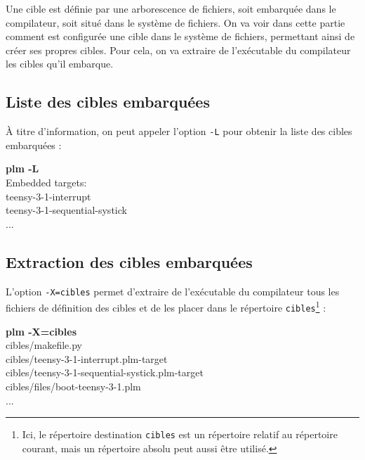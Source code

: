 











Une cible est définie par une arborescence de fichiers, soit embarquée dans le compilateur, soit situé dans le système de fichiers. On va voir dans cette partie comment est configurée une cible dans le système de fichiers, permettant ainsi de créer ses propres cibles. Pour cela, on va extraire de l'exécutable du compilateur les cibles qu'il embarque.

\subsection{Liste des cibles embarquées}
À titre d'information, on peut appeler l'option \texttt{-L} pour obtenir la liste des cibles embarquées :
\begin{SHELL}
{\bfseries plm -L}\\
Embedded targets:\\ 
\hspace*{1.2em}teensy-3-1-interrupt\\
\hspace*{1.2em}teensy-3-1-sequential-systick\\
\hspace*{1.2em}...
\end{SHELL}

\subsection{Extraction des cibles embarquées}
L'option \texttt{-X=cibles} permet d'extraire de l'exécutable du compilateur tous les fichiers de définition des cibles et de les placer dans le répertoire \texttt{cibles}\footnote{Ici, le répertoire destination \texttt{cibles} est un répertoire relatif au répertoire courant, mais un répertoire absolu peut aussi être utilisé.} :
\begin{SHELL}
{\bfseries plm -X=cibles}\\
\hspace*{1.2em}cibles/makef{}ile.py\\
\hspace*{1.2em}cibles/teensy-3-1-interrupt.plm-target\\
\hspace*{1.2em}cibles/teensy-3-1-sequential-systick.plm-target\\
\hspace*{1.2em}cibles/files/boot-teensy-3-1.plm\\
\hspace*{1.2em}...
\end{SHELL}

